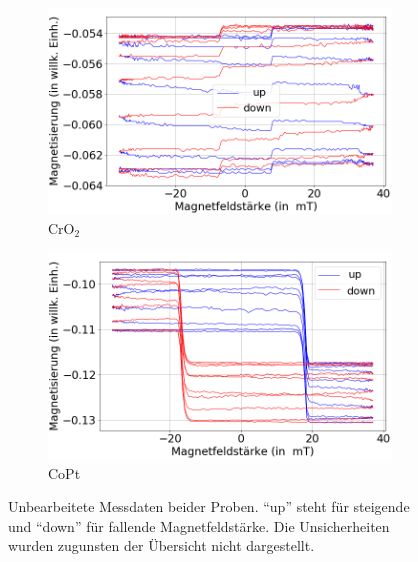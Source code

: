 \begin{figure}[H]
    \centering
    \begin{subfigure}{0.465\textwidth}
        \centering
        \includegraphics[width=1.1\textwidth]{plots/swp_cro_raw}
    \caption{CrO$_2$}
    \end{subfigure}
    \hfill
    \begin{subfigure}{0.465\textwidth}
        \centering
        \includegraphics[width=1.1\textwidth]{plots/swp_copt_raw}
        \caption{CoPt}
    \end{subfigure}
    \caption{Unbearbeitete Messdaten beider Proben. \enquote{up} steht für steigende und \enquote{down} für fallende Magnetfeldstärke. Die Unsicherheiten wurden zugunsten der Übersicht nicht dargestellt.}
      \label{fig_moke_raw}
\end{figure}

